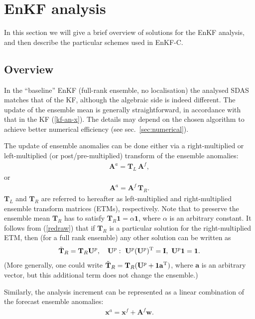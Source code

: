 \documentclass[11pt]{report}
\newcommand{\mb} {\mathbf}
\newcommand{\T}{^{\tiny \mathrm T}}
\begin{document}
\section{EnKF analysis}

In this section we will give a brief overview of solutions for the EnKF analysis, and then describe the particular schemes used in EnKF-C.

\subsection{Overview}

In the ``baseline'' EnKF (full-rank ensemble, no localisation) the analysed SDAS matches that of the KF, although the algebraic side is indeed different.
The update of the ensemble mean is generally straightforward, in accordance with that in the KF (\ref{kf-an-x}).
The details may depend on the chosen algorithm to achieve better numerical efficiency (see sec.~\ref{sec:numerical}).

The update of ensemble anomalies can be done either via a right-multiplied or left-multiplied (or post/pre-multiplied) transform of the ensemble anomalies:
\begin{align}
  \label{T-left}
  \mb A^a = \mb T_L \,\mb A^f,
\end{align}
or
\begin{align}
  \label{T-right}
  \mb A^a = \mb A^f \, \mb T_R.
\end{align}
$\mb T_L$ and $\mb T_R$ are referred to hereafter as left-multiplied and right-multiplied ensemble transform matrices (ETMs), respectively.
Note that to preserve the ensemble mean $\mb T_R$ has to satisfy $\mb T_R \mb 1 = \alpha \mb 1$, where $\alpha$ is an arbitrary constant.
It follows from (\ref{redraw}) that if $\mb T_R$ is a particular solution for the right-multiplied ETM, then (for a full rank ensemble) any other solution can be written as
\begin{align}
  \label{TR-all}
  \tilde{\mb T}_R = \mb T_R \mb U^p, \quad \mb U^p:\ \mb U^p (\mb U^p)\T = \mb I,\ \mb U^p \mb 1 = \mb 1.
\end{align}
(More generally, one could write $\tilde{\mb T}_R = \mb T_R (\mb U^p + \mb 1 \mb a\T)$, where $\mb a$ is an arbitrary vector, but this additional term does not change the ensemble.)

Similarly, the analysis increment can be represented as a linear combination of the forecast ensemble anomalies:
\begin{align}
  \label{w}
  \mb x^a = \mb x^f + \mb A^f \mb w.
\end{align}
\end{document}

